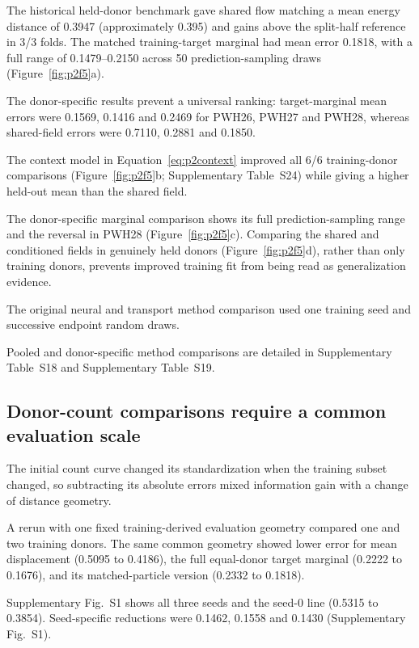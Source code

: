 \documentclass[10pt,a4paper]{article}
\begin{document}
The historical held-donor benchmark gave shared flow matching a mean energy distance of 0.3947 (approximately 0.395) and gains above the split-half reference in 3/3 folds. The matched training-target marginal had mean error 0.1818, with a full range of 0.1479--0.2150 across 50 prediction-sampling draws (Figure~\ref{fig:p2f5}a\label{call:p2f5}).

The donor-specific results prevent a universal ranking: target-marginal mean errors were 0.1569, 0.1416 and 0.2469 for PWH26, PWH27 and PWH28, whereas shared-field errors were 0.7110, 0.2881 and 0.1850.

The context model in Equation~\eqref{eq:p2context} improved all 6/6 training-donor comparisons (Figure~\ref{fig:p2f5}b; Supplementary Table~S24) while giving a higher held-out mean than the shared field.



The donor-specific marginal comparison shows its full prediction-sampling range and the reversal in PWH28 (Figure~\ref{fig:p2f5}c). Comparing the shared and conditioned fields in genuinely held donors (Figure~\ref{fig:p2f5}d), rather than only training donors, prevents improved training fit from being read as generalization evidence.

The original neural and transport method comparison used one training seed and successive endpoint random draws.

Pooled and donor-specific method comparisons are detailed in Supplementary Table~S18 and Supplementary Table~S19.

\subsection{Donor-count comparisons require a common evaluation scale}

The initial count curve changed its standardization when the training subset changed, so subtracting its absolute errors mixed information gain with a change of distance geometry.

A rerun with one fixed training-derived evaluation geometry compared one and two training donors. The same common geometry showed lower error for mean displacement (0.5095 to 0.4186), the full equal-donor target marginal (0.2222 to 0.1676), and its matched-particle version (0.2332 to 0.1818).

Supplementary Fig.~S1\label{call:p2f6} shows all three seeds and the seed-0 line (0.5315 to 0.3854). Seed-specific reductions were 0.1462, 0.1558 and 0.1430 (Supplementary Fig.~S1).
\end{document}
